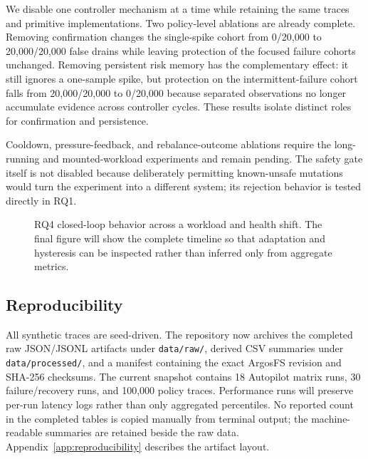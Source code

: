 We disable one controller mechanism at a time while retaining the same traces and primitive implementations. Two policy-level ablations are already complete. Removing confirmation changes the single-spike cohort from 0/20,000 to 20,000/20,000 false drains while leaving protection of the focused failure cohorts unchanged. Removing persistent risk memory has the complementary effect: it still ignores a one-sample spike, but protection on the intermittent-failure cohort falls from 20,000/20,000 to 0/20,000 because separated observations no longer accumulate evidence across controller cycles. These results isolate distinct roles for confirmation and persistence.

Cooldown, pressure-feedback, and rebalance-outcome ablations require the long-running and mounted-workload experiments and remain pending. The safety gate itself is not disabled because deliberately permitting known-unsafe mutations would turn the experiment into a different system; its rejection behavior is tested directly in RQ1.



\begin{figure}[t]
  \centering
  \caption{RQ4 closed-loop behavior across a workload and health shift. The final figure will show the complete timeline so that adaptation and hysteresis can be inspected rather than inferred only from aggregate metrics.}
  \label{fig:rq4-trace}
\end{figure}


\subsection{Reproducibility}
All synthetic traces are seed-driven. The repository now archives the completed raw JSON/JSONL artifacts under \texttt{data/raw/}, derived CSV summaries under \texttt{data/processed/}, and a manifest containing the exact ArgosFS revision and SHA-256 checksums. The current snapshot contains 18 Autopilot matrix runs, 30 failure/recovery runs, and 100,000 policy traces. Performance runs will preserve per-run latency logs rather than only aggregated percentiles. No reported count in the completed tables is copied manually from terminal output; the machine-readable summaries are retained beside the raw data. Appendix~\ref{app:reproducibility} describes the artifact layout.
